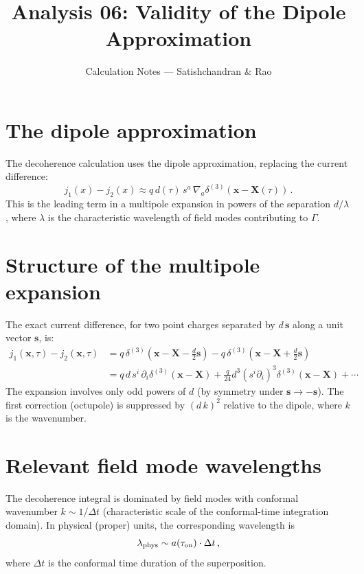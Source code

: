 \documentclass[12pt]{article}
\title{Analysis 06: Validity of the Dipole Approximation}
\author{Calculation Notes --- Satishchandran \& Rao}
\date{}
\newcommand{\Scfac}{a}
\newcommand{\pd}{\partial}
\newcommand{\lb}{\left}
\newcommand{\rb}{\right}
\begin{document}
\maketitle

\section*{The dipole approximation}

The decoherence calculation uses the dipole approximation, replacing the current difference:
%
\begin{equation}
  j_{1}(x) - j_{2}(x)
  \approx
  q\,d(\tau)\,s^{a}\,\nabla_{a}\delta^{(3)}(\mathbf{x}-\mathbf{X}(\tau)) \,.
  \label{eq:dipole}
\end{equation}
%
This is the leading term in a multipole expansion in powers of the separation $d/\lambda$,
where $\lambda$ is the characteristic wavelength of field modes contributing to $\Gamma$.

\section*{Structure of the multipole expansion}

The exact current difference, for two point charges separated by $d\,\mathbf{s}$
along a unit vector $\mathbf{s}$, is:
%
\begin{align}
  j_{1}(\mathbf{x},\tau) - j_{2}(\mathbf{x},\tau)
  &=
  q\,\delta^{(3)}\!\lb(\mathbf{x}-\mathbf{X}-\tfrac{d}{2}\mathbf{s}\rb)
  - q\,\delta^{(3)}\!\lb(\mathbf{x}-\mathbf{X}+\tfrac{d}{2}\mathbf{s}\rb) \nonumber\\
  &=
  q\,d\,s^{i}\,\pd_{i}\delta^{(3)}(\mathbf{x}-\mathbf{X})
  + \frac{q}{24}d^{3}(s^{i}\pd_{i})^{3}\delta^{(3)}(\mathbf{x}-\mathbf{X})
  + \cdots
\end{align}
%
The expansion involves only odd powers of $d$ (by symmetry under $\mathbf{s}\to-\mathbf{s}$).
The first correction (octupole) is suppressed by $(d\,k)^{2}$ relative to the dipole,
where $k$ is the wavenumber.

\section*{Relevant field mode wavelengths}

The decoherence integral is dominated by field modes with conformal wavenumber
$k \sim 1/\Delta t$ (characteristic scale of the conformal-time integration domain).
In physical (proper) units, the corresponding wavelength is
%
\begin{equation}
  \lambda_{\rm phys} \sim \Scfac(\tau_{\rm on})\cdot\Delta t \,,
\end{equation}
%
where $\Delta t$ is the conformal time duration of the superposition.
\end{document}
